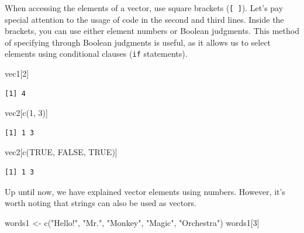\documentclass[
  a4paper,
]{book}
\newenvironment{Shaded}{\begin{snugshade}}{\end{snugshade}}
\newcommand{\ConstantTok}[1]{\textcolor[rgb]{0.56,0.35,0.01}{#1}}
\newcommand{\DecValTok}[1]{\textcolor[rgb]{0.68,0.00,0.00}{#1}}
\newcommand{\FunctionTok}[1]{\textcolor[rgb]{0.28,0.35,0.67}{#1}}
\newcommand{\NormalTok}[1]{\textcolor[rgb]{0.00,0.23,0.31}{#1}}
\newcommand{\OtherTok}[1]{\textcolor[rgb]{0.00,0.23,0.31}{#1}}
\newcommand{\StringTok}[1]{\textcolor[rgb]{0.13,0.47,0.30}{#1}}
\begin{document}
When accessing the elements of a vector, use square brackets
(\texttt{{[}\ {]}}). Let's pay special attention to the usage of code in
the second and third lines. Inside the brackets, you can use either
element numbers or Boolean judgments. This method of specifying through
Boolean judgments is useful, as it allows us to select elements using
conditional clauses (\texttt{if} statements).

\begin{Shaded}
\begin{Highlighting}[]
\NormalTok{vec1[}\DecValTok{2}\NormalTok{]}
\end{Highlighting}
\end{Shaded}

\begin{verbatim}
[1] 4
\end{verbatim}

\begin{Shaded}
\begin{Highlighting}[]
\NormalTok{vec2[}\FunctionTok{c}\NormalTok{(}\DecValTok{1}\NormalTok{, }\DecValTok{3}\NormalTok{)]}
\end{Highlighting}
\end{Shaded}

\begin{verbatim}
[1] 1 3
\end{verbatim}

\begin{Shaded}
\begin{Highlighting}[]
\NormalTok{vec2[}\FunctionTok{c}\NormalTok{(}\ConstantTok{TRUE}\NormalTok{, }\ConstantTok{FALSE}\NormalTok{, }\ConstantTok{TRUE}\NormalTok{)]}
\end{Highlighting}
\end{Shaded}

\begin{verbatim}
[1] 1 3
\end{verbatim}

Up until now, we have explained vector elements using numbers. However,
it's worth noting that strings can also be used as vectors.

\begin{Shaded}
\begin{Highlighting}[]
\NormalTok{words1 }\OtherTok{\textless{}{-}} \FunctionTok{c}\NormalTok{(}\StringTok{"Hello!"}\NormalTok{, }\StringTok{"Mr."}\NormalTok{, }\StringTok{"Monkey"}\NormalTok{, }\StringTok{"Magic"}\NormalTok{, }\StringTok{"Orchestra"}\NormalTok{)}
\NormalTok{words1[}\DecValTok{3}\NormalTok{]}
\end{Highlighting}
\end{Shaded}
\end{document}
